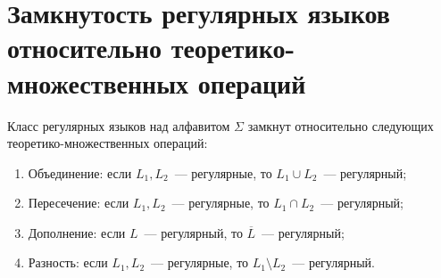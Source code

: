 \section{Замкнутость регулярных языков относительно теоретико-множественных операций}

\begin{theorem}
    Класс регулярных языков над алфавитом $\Sigma$ замкнут относительно следующих теоретико-множественных операций:
    \begin{enumerate}
        \item Объединение: если $L_1, L_2$~--- регулярные, то $L_1 \cup L_2$~--- регулярный;
        \item Пересечение: если $L_1, L_2$~--- регулярные, то $L_1 \cap L_2$~--- регулярный;
        \item Дополнение: если $L$~--- регулярный, то $\overline{L}$~--- регулярный;
        \item Разность: если $L_1, L_2$~--- регулярные, то $L_1 \setminus L_2$~--- регулярный.
    \end{enumerate}
\end{theorem}

